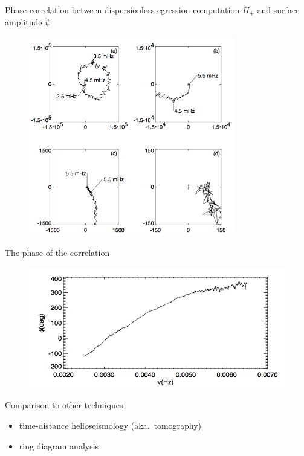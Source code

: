 \documentclass{beamer}
\begin{document}
\begin{frame}
Phase correlation between dispersionless egression computation
$\check{H}_{+}$ and surface amplitude $\check{\psi}$
    \begin{figure}
        \includegraphics[width=0.8\textwidth]{fig_10.png}
    \end{figure}
\end{frame}

\begin{frame}
The phase of the correlation
    \begin{figure}
        \includegraphics[width=\textwidth]{fig_11.png}
    \end{figure}
\end{frame}

\begin{frame}{Comparison to other techniques}
    \begin{itemize}
        \item time-distance helioseismology
            (aka.\ tomography)
        \item ring diagram analysis
    \end{itemize}
\end{frame}

\end{document}
